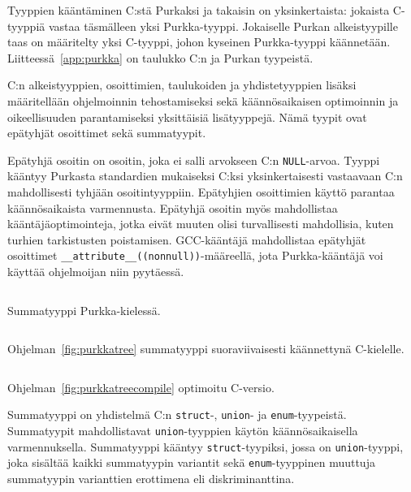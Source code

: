 Tyyppien kääntäminen C:stä Purkaksi ja takaisin on yksinkertaista: jokaista
C-tyyppiä vastaa täsmälleen yksi Purkka-tyyppi. Jokaiselle Purkan
alkeistyypille taas on määritelty yksi C-tyyppi, johon kyseinen Purkka-tyyppi
käännetään. Liitteessä~\ref{app:purkka} on taulukko C:n ja Purkan tyypeistä. 

C:n alkeistyyppien, osoittimien, taulukoiden ja yhdistetyyppien lisäksi
määritellään ohjelmoinnin tehostamiseksi sekä käännösaikaisen optimoinnin ja
oikeellisuuden parantamiseksi yksittäisiä lisätyyppejä. Nämä tyypit ovat
epätyhjät osoittimet sekä summatyypit.

Epätyhjä osoitin on osoitin, joka ei salli arvokseen C:n \texttt{NULL}-arvoa.
Tyyppi kääntyy Purkasta standardien mukaiseksi C:ksi yksinkertaisesti
vastaavaan C:n mahdollisesti tyhjään osoitintyyppiin. Epätyhjien osoittimien
käyttö parantaa käännösaikaista varmennusta. Epätyhjä osoitin myös mahdollistaa
kääntäjäoptimointeja, jotka eivät muuten olisi turvallisesti mahdollisia, kuten
turhien tarkistusten poistamisen. GCC-kääntäjä mahdollistaa epätyhjät
osoittimet \texttt{\_\_attribute\_\_((nonnull))}-määreellä, jota
Purkka-kääntäjä voi käyttää ohjelmoijan niin pyytäessä.

\begin{listing}[ht!]
    \inputminted{Rust}{koodi/sumtype.prk}
    \caption{Summatyyppi Purkka-kielessä.}
    \label{fig:purkkatree}
\end{listing}

\begin{listing}[ht!]
    \inputminted{Rust}{koodi/sumtype.c}
    \caption{Ohjelman~\ref{fig:purkkatree} summatyyppi suoraviivaisesti
    käännettynä C-kielelle.}
    \label{fig:purkkatreecompile}
\end{listing}

\begin{listing}[ht!]
    \inputminted{Rust}{koodi/sumtype2.c}
    \caption{Ohjelman~\ref{fig:purkkatreecompile} optimoitu C-versio.}
    \label{fig:purkkatreecompile2}
\end{listing}

Summatyyppi on yhdistelmä C:n \texttt{struct}-, \texttt{union}- ja
\texttt{enum}-tyypeistä. Summatyypit mahdollistavat \texttt{union}-tyyppien
käytön käännösaikaisella varmennuksella. Summatyyppi kääntyy
\texttt{struct}-tyypiksi, jossa on \texttt{union}-tyyppi, joka sisältää kaikki
summatyypin variantit sekä \texttt{enum}-tyyppinen muuttuja summatyypin
varianttien erottimena eli diskriminanttina.

